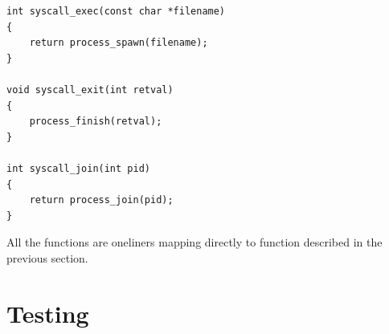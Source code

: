 \documentclass[11pt]{article}
\begin{document}
    \begin{lstlisting}[style=customc]
int syscall_exec(const char *filename)
{
    return process_spawn(filename);
}

void syscall_exit(int retval)
{
    process_finish(retval);
}

int syscall_join(int pid)
{
    return process_join(pid);
}
    \end{lstlisting}

    All the functions are oneliners mapping directly to function described in
    the previous section.

    \section{Testing}
\end{document}
